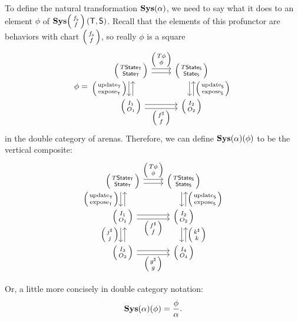\documentclass[DynamicalBook]{subfiles}
\begin{document}
To define the natural transformation $\textbf{Sys}(\alpha)$, we need to say what it
does to an element $\phi$ of $\Cat{Sys}\lens{f_{\flat}}{f}\left(\Sys{T},
  \Sys{S}\right)$. Recall that the elements of this profunctor are behaviors with
  chart $\lens{f_{\flat}}{f}$, so really $\phi$ is a square
\[
  \phi =
    \begin{tikzcd}
      \lens{T\State{T}}{\State{T}} \ar[r, shift left, "\lens{T\phi}{\phi}"] \ar[r, shift right] \ar[d, shift right,
      "\lens{\update{T}}{\expose{T}}"'] \ar[d, shift left, leftarrow] &
      \lens{T\State{S}}{\State{S}} \ar[d, shift left, leftarrow,
      "\lens{\update{S}}{\expose{S}}"] \ar[d, shift right]\\
      \lens{I_1}{O_1} \ar[r, shift right, "\lens{f^{\sharp}}{f}"'] \ar[r,
      shift left] & \lens{I_2}{O_2}
    \end{tikzcd}
\]
in the double category of arenas. Therefore, we can define
$\textbf{Sys}(\alpha)(\phi)$ to be the vertical composite:
\[
  \begin{tikzcd}
    \lens{T\State{T}}{\State{T}} \ar[r, shift left, "\lens{T\phi}{\phi}"] \ar[r, shift right] \ar[d, shift right,
    "\lens{\update{T}}{\expose{T}}"'] \ar[d, shift left, leftarrow] &
    \lens{T\State{S}}{\State{S}} \ar[d, shift left, leftarrow,
    "\lens{\update{S}}{\expose{S}}"] \ar[d, shift right]\\
    \lens{I_1}{O_1} \ar[d, shift right, "\lens{j^{\sharp}}{j}"'] \ar[d, shift left,
        leftarrow] \ar[r, shift right, "\lens{f^{\sharp}}{f}"']
    \ar[r, shift left] & \lens{I_2}{O_2} \ar[d, shift left, leftarrow,
        "\lens{k^{\sharp}}{k}"] \ar[d, shift right]\\
    \lens{I_3}{O_3} \ar[r, shift right, "\lens{g^{\sharp}}{g}"']
    \ar[r, shift left] & \lens{I_4}{O_4} \\
  \end{tikzcd}
\]
Or, a little more concisely in double category notation:
$$\textbf{Sys}(\alpha)(\phi) = \frac{\phi}{\alpha}.$$
\end{document}
